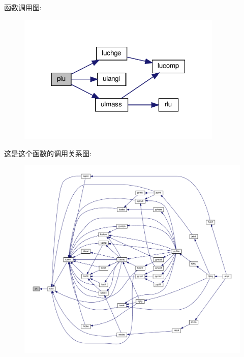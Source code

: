 函数调用图\+:
\nopagebreak
\begin{figure}[H]
\begin{center}
\leavevmode
\includegraphics[width=277pt]{plu_8f90_aeb8c9c33aff79a9658e4b9a0bd0e88c2_cgraph}
\end{center}
\end{figure}
这是这个函数的调用关系图\+:
\nopagebreak
\begin{figure}[H]
\begin{center}
\leavevmode
\includegraphics[width=350pt]{plu_8f90_aeb8c9c33aff79a9658e4b9a0bd0e88c2_icgraph}
\end{center}
\end{figure}
